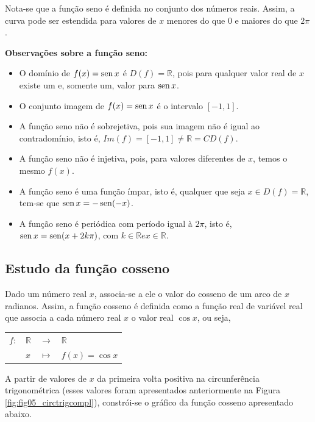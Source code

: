             



Nota-se que a função seno é definida no conjunto dos números reais. Assim, a curva pode ser estendida para valores de $x$ menores do que 0 e maiores do que $2 \pi$.

\textbf{Observações sobre a função seno:}
\begin{itemize}
    \item 	O domínio de $f(x)= \operatorname{sen} x$ é $D(f) = \mathbb{R}$, pois para qualquer valor real de $x$ existe um e, somente um, valor para $\operatorname{sen} x$.
    \item   O conjunto imagem de $f(x)= \operatorname{sen} x$ é o intervalo $[-1,1]$.
    \item   A função seno não é sobrejetiva, pois sua imagem não é igual ao contradomínio, isto é, $Im(f)=[-1,1] \neq \mathbb{R} = CD(f)$.
    \item   A função seno não é injetiva, pois, para valores diferentes de $x$, temos o mesmo $f(x)$.
    \item   A função seno é uma função ímpar, isto é, qualquer que seja $x \in D(f) = \mathbb{R} $, tem-se que $\operatorname{sen} x = - \operatorname{sen} (-x)$.
    \item   A função seno é periódica com período igual à $ 2 \pi$, isto é, $\operatorname{sen} x = \operatorname{sen} (x+2k \pi)$, com $k \in \mathbb{R} e x \in \mathbb{R}$.
\end{itemize}
\subsection{Estudo da função cosseno}

Dado um número real $x$, associa-se a ele o valor do cosseno de um arco de $x$ radianos. Assim, a função cosseno é definida como a função real de variável real que associa a cada número real $x$ o valor real $\cos x$, ou seja,
\begin{center}
\begin{tabular}{llll}
$f:$ & $\mathbb{R}$ & $\rightarrow$ & $\mathbb{R}$\\
   & $x$ & $\mapsto$ & $f(x) = \cos x$\\
\end{tabular}
\end{center}

A partir de valores de $x$ da primeira volta positiva na circunferência trigonométrica (esses valores foram apresentados anteriormente na Figura \ref{fig:fig05_circtrigcompl}), constrói-se o gráfico da função cosseno apresentado abaixo. %

